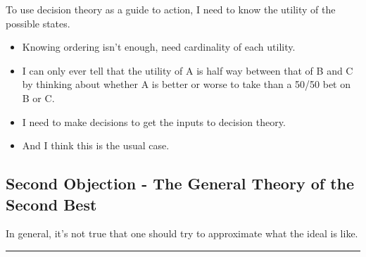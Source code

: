 \documentclass[
  letterpaper,
  DIV=11,
  numbers=noendperiod]{scrartcl}
\providecommand{\tightlist}{%
  \setlength{\itemsep}{0pt}\setlength{\parskip}{0pt}}\usepackage{longtable,booktabs,array}
\begin{document}
To use decision theory as a guide to action, I need to know the utility
of the possible states.

\begin{itemize}
\tightlist
\item
  Knowing ordering isn't enough, need cardinality of each utility.
\item
  I can only ever tell that the utility of A is half way between that of
  B and C by thinking about whether A is better or worse to take than a
  50/50 bet on B or C.
\item
  I need to make decisions to get the inputs to decision theory.
\item
  And I think this is the usual case.
\end{itemize}

\subsection{Second Objection - The General Theory of the Second
Best}\label{second-objection---the-general-theory-of-the-second-best}

In general, it's not true that one should try to approximate what the
ideal is like.

\begin{center}\rule{0.5\linewidth}{0.5pt}\end{center}
\end{document}
